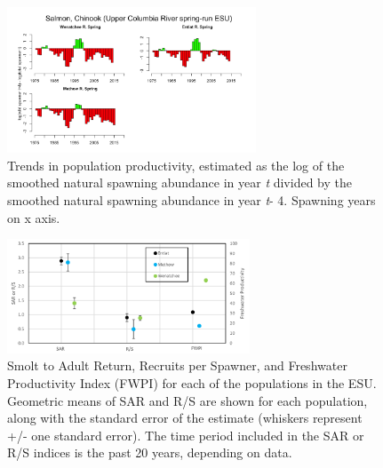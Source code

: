 \documentclass[
  letterpaper,
  oneside,
  open=any]{scrbook}
\begin{document}
\begin{figure}

{\centering \includegraphics[width=2.92in,height=\textheight]{content/Interior_Columbia/../../media/image11.png}

}

\caption{\label{fig-UC-Spr-Chinook-productivity-trends}Trends in
population productivity, estimated as the log of the smoothed natural
spawning abundance in year \emph{t} divided by the smoothed natural
spawning abundance in year \emph{t}- 4. Spawning years on x axis.}

\end{figure}

\begin{figure}

{\centering \includegraphics[width=2.84in,height=\textheight]{content/Interior_Columbia/../../media/image12.png}

}

\caption{\label{fig-UC-Spr-Chinook-Smolt-to-Adult-Productivity}Smolt to
Adult Return, Recruits per Spawner, and Freshwater Productivity Index
(FWPI) for each of the populations in the ESU. Geometric means of SAR
and R/S are shown for each population, along with the standard error of
the estimate (whiskers represent +/- one standard error). The time
period included in the SAR or R/S indices is the past 20 years,
depending on data.}

\end{figure}
\end{document}
